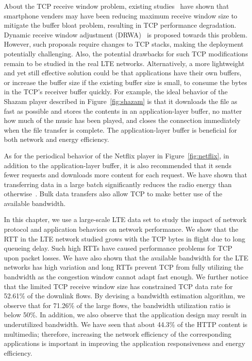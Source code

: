 About the TCP receive window problem, existing studies~\cite{jiang12} have shown that smartphone venders may have been reducing maximum receive window size to mitigate the buffer bloat problem, resulting in TCP performance degradation. Dynamic receive window adjustment (DRWA)~\cite{jiang12} is proposed towards this problem. However, such proposals require changes to TCP stacks, making the deployment potentially challenging. Also, the potential drawbacks for such TCP modifications remain to be studied in the real LTE networks. Alternatively, a more lightweight and yet still effective solution could be that applications have their own buffers, or increase the buffer size if the existing buffer size is small, to consume the bytes in the TCP's receiver buffer quickly. For example, the ideal behavior of the Shazam player described in Figure~\ref{fig:shazam} is that it downloads the file as fast as possible and stores the contents in an application-layer buffer, no matter how much of the music has been played, and closes the connection immediately when the file transfer is complete. The application-layer buffer is beneficial for both network and energy efficiency.

As for the periodical behavior of the Netflix player in Figure~\ref{fig:netflix}, in addition to the application-layer buffer, it is also recommended 
that it sends fewer requests and downloads more content for each request. We have shown that transferring data in a large batch significantly reduces the radio energy than otherwise~\cite{huang_mobisys12}. Bulk data transfers also allow TCP to make better use of the available bandwidth. 

In this chapter, we use a large-scale LTE data set to study the impact of network protocol and application behaviors on network performance. We show that the RTT in the LTE network studied grows with the TCP bytes in flight due to long queueing delay. Such high RTTs have caused performance problems for TCP upon packet losses. We have also shown that the available bandwidth for the LTE networks has high variation and long RTTs prevent TCP from fully utilizing the bandwidth as the congestion window cannot adapt fast enough. We further notice that the limited TCP receive window size has constrained TCP data rate for 52.61\% of the downlink flows. By devising a bandwidth estimation algorithm, we observe that for 71.26\% of the large flows, the bandwidth utilization ratio is below 50\%. In addition, we also observe that the application design may result in underutilized bandwidth. We have seen that about 44.3\% of the HTTP content is multimedia; therefore, increasing the network efficiency of the corresponding applications is important in improving the application responsiveness and energy efficiency.

